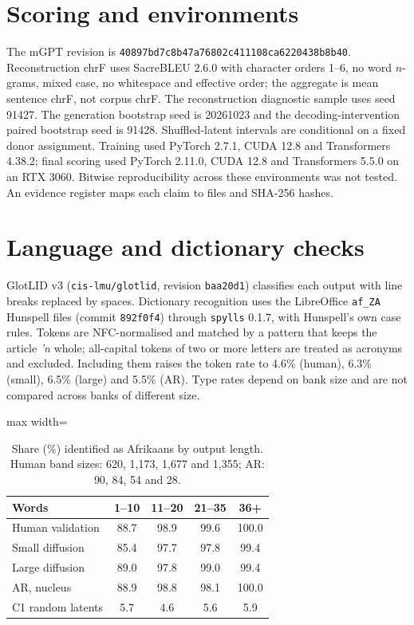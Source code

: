 \documentclass[11pt,a4paper]{article}
\begin{document}
\section{Scoring and environments}
\label{app:scoring}

The mGPT revision is \texttt{40897bd7c8b4\allowbreak 7a76802c4111\allowbreak 08ca6220438b\allowbreak 8b40}. Reconstruction chrF uses SacreBLEU 2.6.0 with character orders 1--6, no word $n$-grams, mixed case, no whitespace and effective order; the aggregate is mean sentence chrF, not corpus chrF. The reconstruction diagnostic sample uses seed 91427. The generation bootstrap seed is 20261023 and the decoding-intervention paired bootstrap seed is 91428. Shuffled-latent intervals are conditional on a fixed donor assignment. Training used PyTorch 2.7.1, CUDA 12.8 and Transformers 4.38.2; final scoring used PyTorch 2.11.0, CUDA 12.8 and Transformers 5.5.0 on an RTX 3060. Bitwise reproducibility across these environments was not tested. An evidence register maps each claim to files and SHA-256 hashes.

\section{Language and dictionary checks}
\label{app:language}

GlotLID v3 (\texttt{cis-lmu/glotlid}, revision \texttt{baa20d1}) classifies each output with line breaks replaced by spaces. Dictionary recognition uses the LibreOffice \texttt{af\_ZA} Hunspell files (commit \texttt{892f0f4}) through \texttt{spylls} 0.1.7, with Hunspell's own case rules. Tokens are NFC-normalised and matched by a pattern that keeps the article \emph{'n} whole; all-capital tokens of two or more letters are treated as acronyms and excluded. Including them raises the token rate to 4.6\% (human), 6.3\% (small), 6.5\% (large) and 5.5\% (AR). Type rates depend on bank size and are not compared across banks of different size.

\begin{table}[h]
\centering
\small
\begin{adjustbox}{max width=\columnwidth}
\begin{tabular}{lcccc}
\toprule
Words & 1--10 & 11--20 & 21--35 & 36+ \\
\midrule
Human validation & 88.7 & 98.9 & 99.6 & 100.0 \\
Small diffusion & 85.4 & 97.7 & 97.8 & 99.4 \\
Large diffusion & 89.0 & 97.8 & 99.0 & 99.4 \\
AR, nucleus & 88.9 & 98.8 & 98.1 & 100.0 \\
C1 random latents & 5.7 & 4.6 & 5.6 & 5.9 \\
\bottomrule
\end{tabular}
\end{adjustbox}
\caption{Share (\%) identified as Afrikaans by output length. Human band sizes: 620, 1,173, 1,677 and 1,355; AR: 90, 84, 54 and 28.}
\label{tab:lid-bands}
\end{table}
\end{document}
